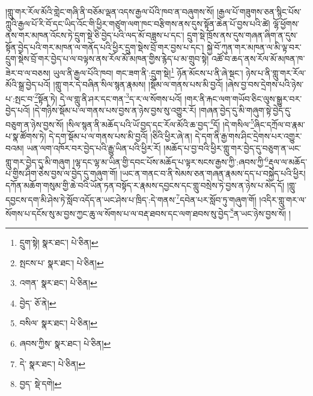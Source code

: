 །གླུ་གར་རོལ་མོའི་གླེང་གཞི་ནི་བཅོམ་ལྡན་འདས་རྒྱལ་པོའི་ཁབ་ན་བཞུགས་སོ། །རྒྱལ་པོ་གཟུགས་ཅན་སྙིང་པོས་ཀླུའི་རྒྱལ་པོ་རི་བོ་དང་ཡིད་འོང་གི་ཕྱིར་གཙུག་ལག་ཁང་བརྩིགས་ནས་དུས་སྟོན་ཆེན་པོ་བྱས་པའི་ཚེ། ལྷོ་ཕྱོགས་ནས་གར་མཁན་འོངས་ཏེ་དྲུག་སྡེ་ཅི་བྱེད་པའི་ལད་མོ་བཟླས་པ་དང་། དྲུག་སྡེ་ཁྲོས་ནས་དུས་གཞན་ཞིག་ན་དུས་སྟོན་བྱེད་པའི་གར་མཁན་ལ་གནོད་པའི་ཕྱིར་དྲུག་སྡེས་བྲོ་གར་བྱས་པ་དང་། སྐྱེ་བོ་ཀུན་གར་མཁན་ལ་མི་ལྟ་བར་དྲུག་སྡེས་བྲོ་གར་བྱེད་པ་ལ་བལྟས་ནས་རོལ་མོ་མཁན་གྱིས་རྙེད་པ་མ་གྲུབ་སྟེ། འཚོ་བ་ཆད་ནས་རོལ་མོ་མཁན་ཁ་ཟེར་བ་ལ་བཅས། ཡུལ་ནི་རྒྱལ་པོའི་ཁབ། གང་ཟག་ནི་:དྲུག་སྡེ།\footnote{དྲུག་སྟེ།  སྣར་ཐང་།  པེ་ཅིན། } ཉོན་མོངས་པ་ནི་ཞེ་སྡང་། ཉེས་པ་ནི་གླུ་གར་རོལ་མོའི་སྒྲ་བྱེད་པའོ། །གླུ་གར་དེ་བཞིན་སིལ་སྙན་རྣམས། །སྡོམ་ལ་གནས་པས་མི་བྱའོ། །ཞེས་བྱ་བས་དྲེགས་པའི་ཉེས་པ་:སྤང་བ་\footnote{སྤངས་པ་  སྣར་ཐང་།  པེ་ཅིན། }སྟོན་ཏེ། དེ་ལ་གླུ་ནི་ཤར་དང་གན་\footnote{འགན་  སྣར་ཐང་།  པེ་ཅིན། }ད་ར་ལ་སོགས་པའོ། །གར་ནི་རྐང་ལག་གཡོབ་ཅིང་ལུས་སྒྱུར་བར་བྱེད་པའོ། །དེ་གཉིས་སྡོམ་པ་ལ་གནས་པས་བྱས་ན་ཉེས་བྱས་སུ་འགྱུར་རོ། །གཞན་བྱེད་དུ་མི་གཞུག་སྟེ་བྱེད་དུ་བཅུག་ན་ཉེས་བྱས་སོ། །སིལ་སྙན་ནི་མཆོད་པའི་ཡོ་བྱད་དང་རོལ་མོའི་ཆ་བྱད་\footnote{བྱེད་  ཅོ་ནེ། }དོ། །དེ་གསིལ་\footnote{བསིལ་  སྣར་ཐང་།  པེ་ཅིན། }ཞིང་དཀྲོལ་བ་རྣམ་པ་སྣ་ཚོགས་ཏེ། དེ་དག་སྡོམ་པ་ལ་གནས་པས་མི་བྱའོ། །ཅིའི་ཕྱིར་ཞེ་ན། དེ་དག་ནི་རྒྱ་གས་ཤིང་དྲེགས་པར་འགྱུར་བའམ། ཡན་ལག་འཁོར་བར་བྱེད་པའི་རྒྱུ་ཡིན་པའི་ཕྱིར་རོ། །མཆོད་པ་བྱ་བའི་ཕྱིར་གླུ་གར་བྱེད་དུ་བཅུག་ན་ཡང་གླུ་གར་བྱེད་དུ་མི་གཞུག །ལྷ་དང་ལྷ་མ་ཡིན་གྱི་དབང་པོས་མཆོད་པ་ལྟར་སངས་རྒྱས་ཀྱི་:ཞབས་ཀྱི་\footnote{ཞབས་ཀྱིས་  སྣར་ཐང་།  པེ་ཅིན། }རྡུལ་ལ་མཆོད་པ་གྱིས་ཤིག་ཅེས་བྱས་ལ་བྱེད་དུ་གཞུག་གོ། །ཡང་ན་གནང་བ་ནི་སེམས་ཅན་གཞན་རྣམས་དད་པ་བསྐྱེད་པའི་ཕྱིར། དཀོན་མཆོག་གསུམ་གྱི་ཆེ་བའི་ཡོན་ཏན་བསྟོད་ར་རྣམས་དབྱངས་དང་གླུ་བསྲེས་ཏེ་བྱས་ན་ཉེས་པ་མེད་དོ། །གླུ་དབྱངས་དག་མི་ཤེས་ཏེ་སློབ་འདོད་ན་ཡང་ཤེས་པ་ཁྲིད་:དེ་གནས་\footnote{དེ་  སྣར་ཐང་།  པེ་ཅིན། }དབེན་པར་སློབ་ཏུ་གཞུག་གོ། །འདིར་གླུ་གར་ལ་སོགས་པ་དངོས་སུ་མ་བྱས་ཀྱང་ཆུ་ལ་སོགས་པ་ལ་བརྡ་ཐབས་དང་ལག་ཐབས་སུ་བྱེད་\footnote{བྱད་  སྡེ་དགེ། }ན་ཡང་ཉེས་བྱས་སོ། །
